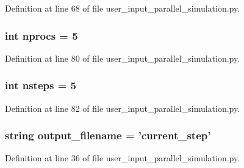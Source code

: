 Definition at line 68 of file user\-\_\-input\-\_\-parallel\-\_\-simulation.\-py.

\hypertarget{namespaceuser__input__parallel__simulation_ad7c4c17cf720ee538e27c02ab356ed6b}{
\subsubsection[{nprocs}]{\setlength{\rightskip}{0pt plus 5cm}int nprocs = 5}}\label{namespaceuser__input__parallel__simulation_ad7c4c17cf720ee538e27c02ab356ed6b}


Definition at line 80 of file user\-\_\-input\-\_\-parallel\-\_\-simulation.\-py.

\hypertarget{namespaceuser__input__parallel__simulation_aa2414080b021dbb9b56eeaeedec0ffa2}{
\subsubsection[{nsteps}]{\setlength{\rightskip}{0pt plus 5cm}int nsteps = 5}}\label{namespaceuser__input__parallel__simulation_aa2414080b021dbb9b56eeaeedec0ffa2}


Definition at line 82 of file user\-\_\-input\-\_\-parallel\-\_\-simulation.\-py.

\hypertarget{namespaceuser__input__parallel__simulation_ac0647ad8713153cc6b448750dbeb1b15}{
\subsubsection[{output\-\_\-filename}]{\setlength{\rightskip}{0pt plus 5cm}string output\-\_\-filename = 'current\-\_\-step'}}\label{namespaceuser__input__parallel__simulation_ac0647ad8713153cc6b448750dbeb1b15}


Definition at line 36 of file user\-\_\-input\-\_\-parallel\-\_\-simulation.\-py.

